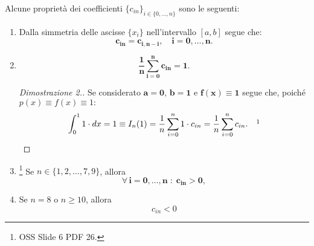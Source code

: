 \begin{property}
	Alcune proprietà dei coefficienti $\{c_{in}\}_{i\in\{0, \hdots,n\}}$ sono le seguenti:
	\begin{enumerate}
	    \item \footnotemark Dalla simmetria delle ascisse $\{x_i\}$ nell'intervallo $[a,b]$ segue che:
	    \begin{equation}\label{eq:simmCoeffN-C}
	        \boldsymbol{c_{in}=c_{i,n-i},\quad i=0,\hdots,n.}
	    \end{equation}
	    \item \footnotemark \begin{equation}\label{eq:coeffN-CEq1}
	        \boldsymbol{\frac{1}{n}\sum_{i=0}^{n}c_{in}=1}.
	    \end{equation}
	    \begin{proof}[Dimostrazione 2.]
	        Se considerato $\boldsymbol{a=0},\, \boldsymbol{b=1}$ e $\boldsymbol{f(x)\equiv1}$ segue che, poiché $p(x)\equiv f(x)\equiv 1:$
	        \begin{equation*}
	            \int_0^1 1\cdot dx=1\equiv I_n(1)=\frac{1}{n}\sum_{i=0}^n1\cdot 	c_{in}=\frac{1}{n}\sum_{i=0}^nc_{in}.\quad\footnotemark
	        \end{equation*}
	    \end{proof}
	    \item \footnote{OSS Slide 6 PDF 26.} Se $n\in\{1,2,\hdots, 7, 9\}$, allora
	    \begin{equation}\label{eq:coefficiente_formula_N-C_GT0}
	    	\boldsymbol{\forall\, i=0,\hdots, n\; :\; c_{in} > 0},
	    \end{equation}
	    \item Se $n=8$ o $n\geq 10$, allora 
	    \begin{equation}\label{eq:coefficiente_formula_N-C_LT0}
	    	c_{in} < 0
	    \end{equation}
	\end{enumerate}
\end{property}

